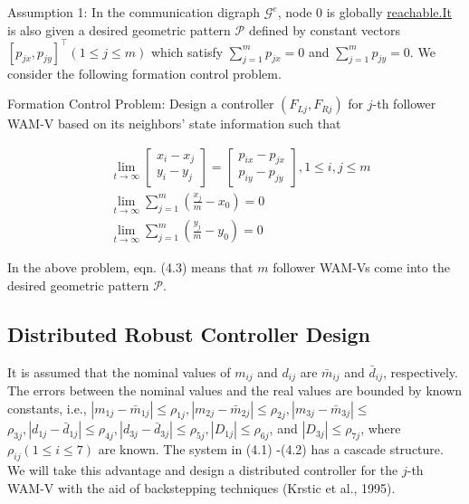 \documentclass[10pt]{article}
\begin{document}
Assumption 1: In the communication digraph $\mathcal{G}^{e}$, node 0 is globally \href{http://reachable.It}{reachable.It} is also given a desired geometric pattern $\mathcal{P}$ defined by constant vectors $\left[p_{j x}, p_{j y}\right]^{\top}(1 \leq j \leq m)$ which satisfy $\sum_{j=1}^{m} p_{j x}=0$ and $\sum_{j=1}^{m} p_{j y}=0$. We consider the following formation control problem.

Formation Control Problem: Design a controller $\left(F_{L j}, F_{R j}\right)$ for $j$-th follower WAM-V based on its neighbors' state information such that

$$
\begin{aligned}
& \lim _{t \rightarrow \infty}\left[\begin{array}{l}
x_{i}-x_{j} \\
y_{i}-y_{j}
\end{array}\right]=\left[\begin{array}{l}
p_{i x}-p_{j x} \\
p_{i y}-p_{j y}
\end{array}\right], 1 \leq i, j \leq m \\
& \lim _{t \rightarrow \infty} \sum_{j=1}^{m}\left(\frac{x_{j}}{m}-x_{0}\right)=0 \\
& \lim _{t \rightarrow \infty} \sum_{j=1}^{m}\left(\frac{y_{j}}{m}-y_{0}\right)=0
\end{aligned}
$$

In the above problem, eqn. (4.3) means that $m$ follower WAM-Vs come into the desired geometric pattern $\mathcal{P}$.

\subsection{Distributed Robust Controller Design}
It is assumed that the nominal values of $m_{i j}$ and $d_{i j}$ are $\bar{m}_{i j}$ and $\bar{d}_{i j}$, respectively. The errors between the nominal values and the real values are bounded by known constants, i.e., $\left|m_{1 j}-\bar{m}_{1 j}\right| \leq \rho_{1 j},\left|m_{2 j}-\bar{m}_{2 j}\right| \leq \rho_{2 j},\left|m_{3 j}-\bar{m}_{3 j}\right| \leq$ $\rho_{3 j},\left|d_{1 j}-\bar{d}_{1 j}\right| \leq \rho_{4 j},\left|d_{3 j}-\bar{d}_{3 j}\right| \leq \rho_{5 j},\left|D_{1 j}\right| \leq \rho_{6 j}$, and $\left|D_{3 j}\right| \leq \rho_{7 j}$, where $\rho_{i j}(1 \leq i \leq 7)$ are known. The system in (4.1) -(4.2) has a cascade structure. We will take this advantage and design a distributed controller for the $j$-th WAM-V with the aid of backstepping techniques (Krstic et al., 1995).
\end{document}
